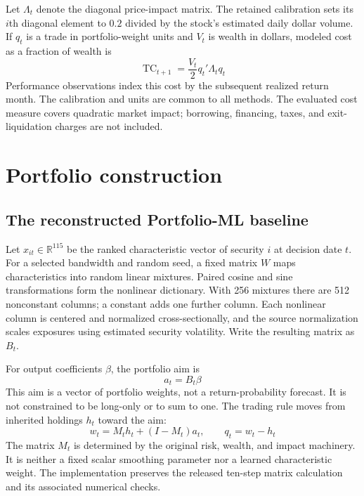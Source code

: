 \documentclass[12pt,letterpaper,fleqn]{article}
\newcommand{\R}{\mathbb{R}}
\begin{document}
Let $\Lambda_t$ denote the diagonal price-impact matrix. The retained calibration sets its $i$th diagonal element to $0.2$ divided by the stock's estimated daily dollar volume. If $q_t$ is a trade in portfolio-weight units and $V_t$ is wealth in dollars, modeled cost as a fraction of wealth is
\begin{equation}\label{eq:cost}
 \operatorname{TC}_{t+1}=\frac{V_t}{2}q_t'\Lambda_tq_t
\end{equation}
Performance observations index this cost by the subsequent realized return month. The calibration and units are common to all methods. The evaluated cost measure covers quadratic market impact; borrowing, financing, taxes, and exit-liquidation charges are not included.

\section{Portfolio construction}\label{sec:method}
\subsection{The reconstructed Portfolio-ML baseline}
Let $x_{it}\in\R^{115}$ be the ranked characteristic vector of security $i$ at decision date $t$. For a selected bandwidth and random seed, a fixed matrix $W$ maps characteristics into random linear mixtures. Paired cosine and sine transformations form the nonlinear dictionary. With 256 mixtures there are 512 nonconstant columns; a constant adds one further column. Each nonlinear column is centered and normalized cross-sectionally, and the source normalization scales exposures using estimated security volatility. Write the resulting matrix as $B_t$.

For output coefficients $\beta$, the portfolio aim is
\begin{equation}\label{eq:aim}
 a_t=B_t\beta
\end{equation}
This aim is a vector of portfolio weights, not a return-probability forecast. It is not constrained to be long-only or to sum to one. The trading rule moves from inherited holdings $h_t$ toward the aim:
\begin{equation}\label{eq:trade}
 w_t=M_th_t+(I-M_t)a_t,\qquad q_t=w_t-h_t
\end{equation}
The matrix $M_t$ is determined by the original risk, wealth, and impact machinery. It is neither a fixed scalar smoothing parameter nor a learned characteristic weight. The implementation preserves the released ten-step matrix calculation and its associated numerical checks.
\end{document}

